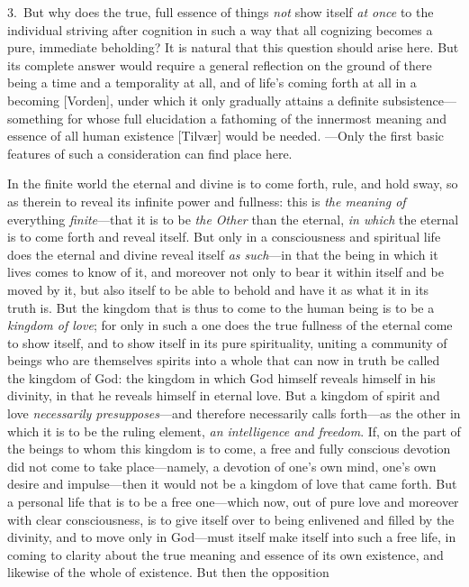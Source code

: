 \documentclass[12pt,a4paper]{book}
\begin{document}
3.~But why does the true, full essence of things \emph{not} show itself \emph{at once} to the
individual striving after cognition in such a way that all cognizing becomes a
pure, immediate beholding? It is natural that this question should arise here.
But its complete answer would require a general reflection on the ground of there
being a time and a temporality at all, and of life's coming forth at all in a
becoming [Vorden], under which it only gradually attains a definite
subsistence---something for whose full elucidation a fathoming of the innermost
meaning and essence of all human existence [Tilvær] would be needed. ---Only the
first basic features of such a consideration can find place here.

In the finite world the eternal and divine is to come forth, rule, and hold sway,
so as therein to reveal its infinite power and fullness: this is \emph{the meaning of}
everything \emph{finite}---that it is to be \emph{the Other} than the eternal, \emph{in which}
the eternal is to come forth and reveal itself. But only in a consciousness and
spiritual life does the eternal and divine reveal itself \emph{as such}---in that
the being in which it lives comes to know of it, and moreover not only to bear it
within itself and be moved by it, but also itself to be able to behold and have
it as what it in its truth is. But the kingdom that is thus to come to the human
being is to be a \emph{kingdom of love}; for only in such a one does the true
fullness of the eternal come to show itself, and to show itself in its pure
spirituality, uniting a community of beings who are themselves spirits into a
whole that can now in truth be called the kingdom of God: the kingdom in which
God himself reveals himself in his divinity, in that he reveals himself in
eternal love. But a kingdom of spirit and love \emph{necessarily
presupposes}---and therefore necessarily calls forth---as the other in which it is
to be the ruling element, \emph{an intelligence and freedom}. If, on the part of
the beings to whom this kingdom is to come, a free and fully conscious devotion
did not come to take place---namely, a devotion of one's own mind, one's own
desire and impulse---then it would not be a kingdom of love that came forth. But
a personal life that is to be a free one---which now, out of pure love and
moreover with clear consciousness, is to give itself over to being enlivened and
filled by the divinity, and to move only in God---must itself make itself into
such a free life, in coming to clarity about the true meaning and essence of its
own existence, and likewise of the whole of existence. But then the opposition
\end{document}
